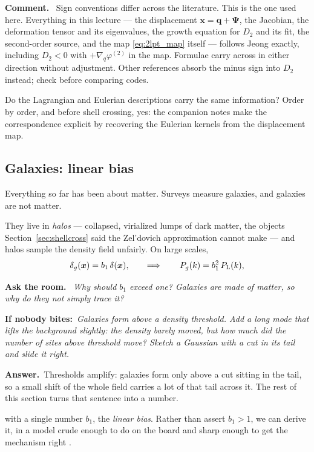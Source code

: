 \documentclass[a4paper,11pt]{article}
\newcommand{\vx}{\bm{x}}
\newcommand{\vq}{\bm{q}}
\newcommand{\vPsi}{\bm{\Psi}}
\def\Plin{P_{\rm L}}
\numberwithin{equation}{section}
\newenvironment{remark}
  {\par\medskip\noindent\begingroup\small\color{ForestGreen!60!black}\textbf{Comment.}\ }
  {\endgroup\par\medskip}
\newenvironment{quiz}
  {\par\medskip\noindent\begingroup\small\color{RoyalBlue!65!black}%
   \textbf{Ask the room.}\ \itshape}
  {\endgroup\par\medskip}
\newcommand{\nudge}[1]{\upshape\par\smallskip\hspace*{1.2em}\textbf{If nobody bites:}\ \itshape #1}
\newcommand{\answer}[1]{\upshape\par\smallskip\hspace*{1.2em}\textbf{Answer.}\ #1}
\begin{document}
\begin{remark}
Sign conventions differ across the literature. This is the one used here. Everything in this lecture --- the displacement $\vx = \vq + \vPsi$, the
Jacobian, the deformation tensor and its eigenvalues, the growth equation for
$D_2$ and its fit, the second-order source, and the map \eqref{eq:2lpt_map}
itself --- follows Jeong \cite[App.~E]{Jeong2010} exactly, including $D_2 < 0$
with $+\nabla_q\varphi^{(2)}$ in the map. Formulae carry across in either
direction without adjustment. Other references absorb the minus sign into $D_2$
instead; check before comparing codes.
\end{remark}

Do the Lagrangian and Eulerian descriptions carry the same information?
Order by order, and before shell crossing, yes: the companion notes
\cite{EFTnotes} make the correspondence explicit by recovering the Eulerian
kernels from the displacement map.

\subsection{Galaxies: linear bias}
\label{sec:bias}

Everything so far has been about matter. Surveys measure galaxies, and galaxies
are not matter.

They live in \emph{halos} --- collapsed, virialized lumps of dark matter, the
objects Section~\ref{sec:shellcross} said the Zel'dovich approximation cannot
make --- and halos sample the density field unfairly. On large scales,
\begin{equation}
\delta_g(\vx) = b_1\,\delta(\vx) ,
\qquad\Longrightarrow\qquad
P_g(k) = b_1^2\,\Plin(k) ,
\label{eq:linear_bias}
\end{equation}
\begin{quiz}
Why should $b_1$ exceed one? Galaxies are made of matter, so why do they not simply trace it?
\nudge{Galaxies form above a density threshold. Add a long mode that lifts the
background slightly: the density barely moved, but how much did the \emph{number
of sites above threshold} move? Sketch a Gaussian with a cut in its tail and
slide it right.}
\answer{Thresholds amplify: galaxies form only above a cut sitting in the tail,
so a small shift of the whole field carries a lot of that tail across it. The
rest of this section turns that sentence into a number.}
\end{quiz}

with a single number $b_1$, the \emph{linear bias}. Rather than assert
$b_1 > 1$, we can derive it, in a model crude enough to do on the board and
sharp enough to get the mechanism right \cite[\S 2.1]{BiasReview}.
\end{document}
